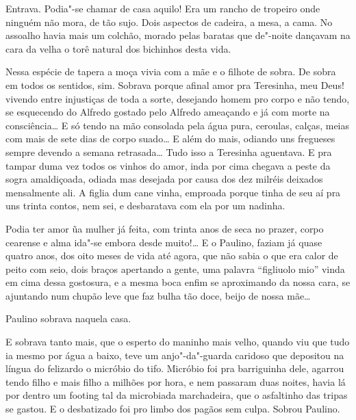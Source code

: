 
Entrava. Podia"-se chamar de casa aquilo! Era um rancho de tropeiro onde
ninguém não mora, de tão sujo. Dois aspectos de cadeira, a mesa, a cama.
No assoalho havia mais um colchão, morado pelas baratas que de"-noite
dançavam na cara da velha o torê natural dos bichinhos desta vida.


Nessa espécie de tapera a moça vivia com a mãe e o filhote de sobra. De
sobra em todos os sentidos, sim. Sobrava porque afinal amor pra
Teresinha, meu Deus! vivendo entre injustiças de toda a sorte, desejando
homem pro corpo e não tendo, se esquecendo do Alfredo gostado pelo
Alfredo ameaçando e já com morte na consciência\ldots{} E só tendo na mão
consolada pela água pura, ceroulas, calças, meias com mais de sete dias
de corpo suado\ldots{} E além do mais, odiando uns fregueses sempre devendo a
semana retrasada\ldots{} Tudo isso a Teresinha aguentava. E pra tampar duma
vez todos os vinhos do amor, inda por cima chegava a peste da sogra
amaldiçoada, odiada mas desejada por causa dos dez milréis deixados
mensalmente ali. A figlia dum cane vinha, emproada porque tinha de seu
aí pra uns trinta contos, nem sei, e desbaratava com ela por um
nadinha. 

Podia ter amor ũa mulher já feita, com trinta anos de seca no prazer,
corpo cearense e alma ida"-se embora desde muito!\ldots{} E o Paulino, faziam
já quase quatro anos, dos oito meses de vida até agora, que não sabia o
que era calor de peito com seio, dois braços apertando a gente, uma
palavra ``figliuolo mio'' vinda em cima dessa gostosura, e a mesma boca
enfim se aproximando da nossa cara, se ajuntando num chupão leve que faz
bulha tão doce, beijo de nossa mãe\ldots{}

Paulino sobrava naquela casa.

E sobrava tanto mais, que o esperto do maninho mais velho, quando viu
que tudo ia mesmo por água a baixo, teve um anjo"-da"-guarda caridoso que
depositou na língua do felizardo o micróbio do tifo. Micróbio foi pra
barriguinha dele, agarrou tendo filho e mais filho a milhões por hora, e
nem passaram duas noites, havia lá por dentro um footing tal da
microbiada marchadeira, que o asfaltinho das tripas se gastou. E o
desbatizado foi pro limbo dos pagãos sem culpa. Sobrou Paulino.

